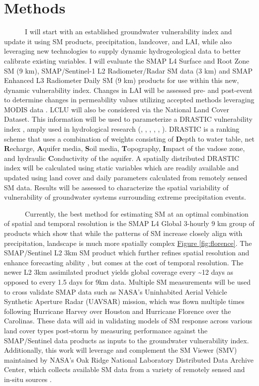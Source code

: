 \documentclass[
]{book}
\begin{document}
\hypertarget{methods}{%
\chapter{Methods}\label{methods}}

~~~~~~I will start with an established groundwater vulnerability index and update it using SM products, precipitation, landcover, and LAI, while also leveraging new technologies to supply dynamic hydrogeological data to better calibrate existing variables. I will evaluate the SMAP L4 Surface and Root Zone SM (9 km), SMAP/Sentinel-1 L2 Radiometer/Radar SM data (3 km) and SMAP Enhanced L3 Radiometer Daily SM (9 km) products for use within this new, dynamic vulnerability index. Changes in LAI will be assessed pre- and post-event to determine changes in permeability values utilizing accepted methods leveraging MODIS data \citep{song2013optical}. LCLU will also be considered via the National Land Cover Dataset. This information will be used to parameterize a DRASTIC vulnerability index \citep{aller1985}, amply used in hydrological research (\citet{hamza2006}, \citet{jang2017}, \citet{panagopoulos2006}, \citet{remesan2008}, \citet{rundquist1991}, \citet{uddameri2007}). DRASTIC is a ranking scheme that uses a combination of weights consisting of \textbf{D}epth to water table, net \textbf{R}echarge, \textbf{A}quifer media, \textbf{S}oil media, \textbf{T}opography, \textbf{I}mpact of the vadose zone, and hydraulic \textbf{C}onductivity of the aquifer. A spatially distributed DRASTIC index will be calculated using static variables which are readily available and updated using land cover and daily parameters calculated from remotely sensed SM data. Results will be assessed to characterize the spatial variability of vulnerability of groundwater systems surrounding extreme precipitation events.

~~~~~~Currently, the best method for estimating SM at an optimal combination of spatial and temporal resolution is the SMAP L4 Global 3-hourly 9 km group of products which show that while the patterns of SM increase closely align with precipitation, landscape is much more spatially complex \protect\hyperlink{fig:florence}{Figure \ref{fig:florence}}. The SMAP/Sentinel L2 3km SM product which further refines spatial resolution and enhance forecasting ability \citep{das2018}, but comes at the cost of temporal resolution. The newer L2 3km assimilated product yields global coverage every \textasciitilde12 days as opposed to every 1.5 days for 9km data. Multiple SM measurements will be used to cross validate SMAP data such as NASA's Uninhabited Aerial Vehicle Synthetic Aperture Radar (UAVSAR) mission, which was flown multiple times following Hurricane Harvey over Houston and Hurricane Florence over the Carolinas. These data will aid in validating models of SM response across various land cover types post-storm by measuring performance against the SMAP/Sentinel data products as inputs to the groundwater vulnerability index. Additionally, this work will leverage and complement the SM Viewer (SMV) maintained by NASA's Oak Ridge National Laboratory Distributed Data Archive Center, which collects available SM data from a variety of remotely sensed and in-situ sources \citep{shrestha2019}.
\end{document}
